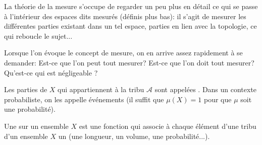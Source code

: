 \medskip
\begin{histoire}
La théorie de la mesure s'occupe de regarder un peu plus en détail ce qui se
passe à l'intérieur des espaces dits mesurés (définis plus bas): il s'agit
de mesurer les différentes parties existant dans un tel espace, parties en lien
avec la topologie, ce qui reboucle le sujet...

\medskip
Lorsque l'on évoque le concept de mesure, on en arrive assez rapidement
à se demander: Est-ce que l'on peut tout mesurer? Est-ce
que l'on doit tout mesurer? Qu'est-ce qui est négligeable ?

\medskip
{}
\end{histoire}

Les parties de $X$ qui appartiennent à la tribu $\mathcal{A}$ sont appelées .
Dans un contexte probabiliste, on les appelle événements (il suffit que $\mu(X)=1$ pour que $\mu$ soit
une probabilité).

Une  sur un ensemble $X$ est une fonction qui
associe à chaque élément d'une tribu d'un ensemble $X$ un 
(une longueur, un volume, une probabilité...).

